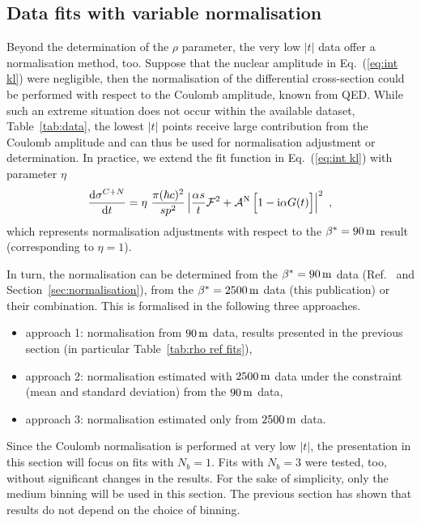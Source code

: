 \subsection{Data fits with variable normalisation}
\label{sec:rho anal norm var}

Beyond the determination of the $\rho$ parameter, the very low $|t|$ data offer a normalisation method, too. Suppose that the nuclear amplitude in Eq.~(\ref{eq:int kl}) were negligible, then the normalisation of the differential cross-section could be performed with respect to the Coulomb amplitude, known from QED. While such an extreme situation does not occur within the available dataset, Table~\ref{tab:data}, the lowest $|t|$ points receive large contribution from the Coulomb amplitude and can thus be used for normalisation adjustment or determination. In practice, we extend the fit function in Eq.~(\ref{eq:int kl}) with parameter $\eta$
\begin{equation}
\label{eq:fit fcn eta}
{\d\sigma^{C+N}\over \d t} = \eta\ {\pi (\hbar c)^2 \over s p^2} \left | {\alpha s\over t} {\cal F}^2
			+ {\cal A}^{\rm N}\, \Big[1 - \I\alpha G(t)\Big] \right |^2\ ,
\end{equation}
which represents normalisation adjustments with respect to the $\beta^* = 90\,{\rm m}$ result \cite{totem-13tev-90m} (corresponding to $\eta = 1$).

In turn, the normalisation can be determined from the $\beta^* = 90\,{\rm m}$ data (Ref.~\cite{totem-13tev-90m} and Section~\ref{sec:normalisation}), from the $\beta^* = 2500\,{\rm m}$ data (this publication) or their combination. This is formalised in the following three approaches.
\begin{itemize}[noitemsep,topsep=0pt]
\item approach 1: normalisation from $90\,{\rm m}$ data, results presented in the previous section (in particular Table~\ref{tab:rho ref fits}),
\item approach 2: normalisation estimated with $2500\,{\rm m}$ data under the constraint (mean and standard deviation) from the $90\,{\rm m}$ data,
\item approach 3: normalisation estimated only from $2500\,{\rm m}$ data.
\end{itemize}

Since the Coulomb normalisation is performed at very low $|t|$, the presentation in this section will focus on fits with $N_b = 1$. Fits with $N_b = 3$ were tested, too, without significant changes in the results. For the sake of simplicity, only the medium binning will be used in this section. The previous section has shown that results do not depend on the choice of binning.

